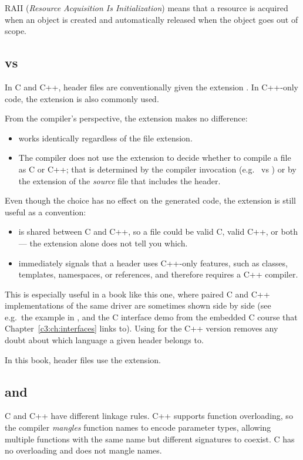 \note RAII (\emph{Resource Acquisition Is Initialization}) means that a resource is acquired when
an object is created and automatically released when the object goes out of scope.

\subsection{ vs }
\label{c1:sec:hpp}
In C and C++, header files are conventionally given the extension . In C++-only code,
the extension  is also commonly used.

From the compiler's perspective, the extension makes no difference:
\begin{itemize}
  \item {} works identically regardless of the file extension.
  \item The compiler does not use the extension to decide whether to compile a file as C or C++;
    that is determined by the compiler invocation (e.g.\  vs ) or by the
    extension of the \emph{source} file that includes the header.
\end{itemize}
Even though the choice has no effect on the generated code, the extension is still useful as a
convention:
\begin{itemize}
  \item {} is shared between C and C++, so a  file could be valid C, valid C++, or
    both --- the extension alone does not tell you which.
  \item {} immediately signals that a header uses C++-only features, such as classes,
    templates, namespaces, or references, and therefore requires a C++ compiler.
\end{itemize}
This is especially useful in a book like this one, where paired C and C++ implementations of the
same driver are sometimes shown side by side (see e.g.\ the  example in
, and the C interface demo from the embedded C course that
Chapter~\ref{c3:ch:interfaces} links to). Using  for the C++ version removes any doubt
about which language a given header belongs to.

\note In this book, header files use the  extension.

\subsection{ and }
\label{c1:sec:externc}
C and C++ have different linkage rules. C++ supports function overloading, so the compiler
\emph{mangles} function names to encode parameter types, allowing multiple functions with the same
name but different signatures to coexist. C has no overloading and does not mangle names.

